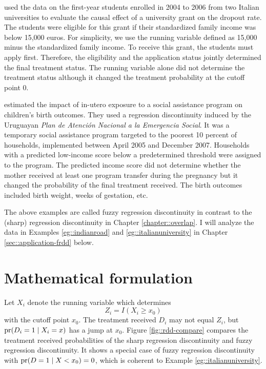 \begin{example}\label{eg::italianuniversity}
\citet{li2015evaluating} used the data on the first-year students enrolled in 2004 to 2006 from two Italian universities to evaluate the causal effect of a university grant on the dropout rate. The students were eligible for this grant if their standardized family income was below  15,000 euros. For simplicity, we use the running variable defined as 15,000 minus the standardized family income. To receive this grant, the students must apply first. Therefore, the eligibility and the application status jointly determined the final treatment status. The running variable alone did not determine the treatment status although it changed the treatment probability at the cutoff point 0. 
\end{example}



\begin{example}
\citet{amarante2016cash} estimated the impact of in-utero exposure to a social assistance program on children's birth outcomes. They used a  regression discontinuity induced by the Uruguayan {\it Plan de Atención Nacional a la Emergencia Social}. It was a temporary social assistance program targeted to the poorest 10 percent of
households, implemented between April 2005 and December 2007. 
Households with a predicted low-income score below a predetermined threshold were assigned to the program. The predicted income score did not determine whether the mother received at least one program transfer during the pregnancy but it changed the probability of the final treatment received. The birth outcomes included birth weight, weeks of gestation, etc. 
\end{example}


The above examples are called fuzzy regression discontinuity in contrast to the (sharp) regression discontinuity in Chapter \ref{chapter::overlap}.  I will analyze the data in  Examples \ref{eg::indianroad} and \ref{eg::italianuniversity} in Chapter \ref{sec::application-frdd} below. 

\section{Mathematical formulation}
\label{sec::frdd-math}


Let $X_i$ denote the running variable which determines 
$$
Z_i = I(X_i \geq x_0)
$$ 
with the cutoff point $x_0$. The treatment received $D_i$ may not equal $Z_i$, but $\textup{pr}(D_i=1\mid X_i = x)$ has a jump at $x_0$. Figure \ref{fig::rdd-compare} compares the treatment received probabilities of the sharp regression discontinuity and fuzzy regression discontinuity. It shows a special case of fuzzy regression discontinuity with $\textup{pr}(D=1\mid X < x_0) = 0$, which is coherent to Example \ref{eg::italianuniversity}. 


